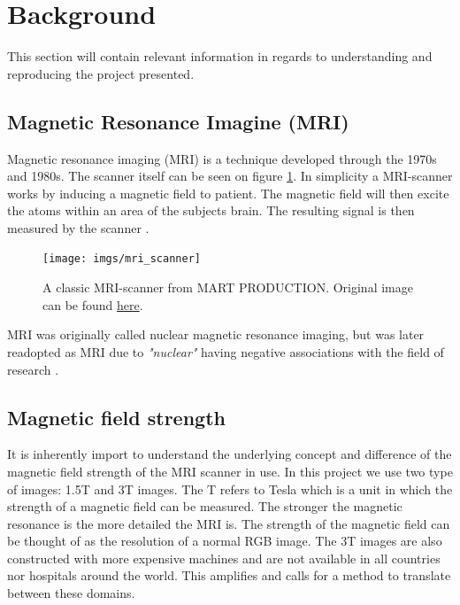 \documentclass[12pt, fleqn, titlepage]{article}
\begin{document}
\section{Background}

This section will contain relevant information in regards to understanding and reproducing the project presented. 

\subsection{Magnetic Resonance Imagine (MRI)}
Magnetic resonance imaging (MRI) is a technique developed through the 1970s and 1980s. The scanner itself can be seen on figure \ref{fig:mriscanner}. In simplicity a MRI-scanner works by inducing a magnetic field to patient. The magnetic field will then excite the atoms within an area of the subjects brain. The resulting signal is then measured by the scanner \cite{mri}.  
\begin{figure}[H]
	\centering
	\texttt{[image: imgs/mri\_scanner]}
	\caption{A classic MRI-scanner from MART PRODUCTION. Original image can be found \href{https://www.pexels.com/photo/technology-hospital-medicine-indoors-7089017/}{here}. }
	\label{fig:mriscanner}
\end{figure}

MRI was originally called nuclear magnetic resonance imaging, but was later readopted as MRI due to \textit{"nuclear"} having negative associations with the field of research \cite{wiki} \cite{mri2}.

\subsection{Magnetic field strength}
It is inherently import to understand the underlying concept and difference of the magnetic field strength of the MRI scanner in use. In this project we use two type of images: 1.5T and 3T images. The T refers to Tesla which is a unit in which the strength of a magnetic field can be measured. The stronger the magnetic resonance is the more detailed the MRI is. The strength of the magnetic field can be thought of as the resolution of a normal RGB image. The 3T images are also constructed with more expensive machines and are not available in all countries nor hospitals around the world. This amplifies and calls for a method to translate between these domains. 
\end{document}
